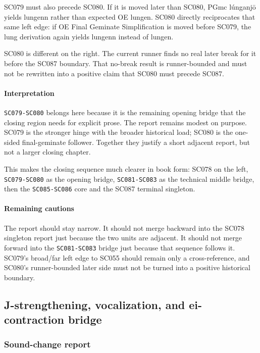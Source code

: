 \documentclass[
  british,
  a4paper,
]{article}
\begin{document}
SC079 must also precede SC080. If it is moved later than SC080, PGmc
lúnganjō yields lungenn rather than expected OE lungen. SC080 directly
reciprocates that same left edge: if OE Final Geminate Simplification is
moved before SC079, the lung derivation again yields lungenn instead of
lungen.

SC080 is different on the right. The current runner finds no real later
break for it before the SC087 boundary. That no-break result is
runner-bounded and must not be rewritten into a positive claim that
SC080 must precede SC087.

\paragraph{Interpretation}\label{interpretation-49}

\texttt{SC079-SC080} belongs here because it is the remaining opening
bridge that the closing region needs for explicit prose. The report
remains modest on purpose. SC079 is the stronger hinge with the broader
historical load; SC080 is the one-sided final-geminate follower.
Together they justify a short adjacent report, but not a larger closing
chapter.

This makes the closing sequence much clearer in book form: SC078 on the
left, \texttt{SC079-SC080} as the opening bridge, \texttt{SC081-SC083}
as the technical middle bridge, then the \texttt{SC085-SC086} core and
the SC087 terminal singleton.

\paragraph{Remaining cautions}\label{remaining-cautions-49}

The report should stay narrow. It should not merge backward into the
SC078 singleton report just because the two units are adjacent. It
should not merge forward into the \texttt{SC081-SC083} bridge just
because that sequence follows it. SC079's broad/far left edge to SC055
should remain only a cross-reference, and SC080's runner-bounded later
side must not be turned into a positive historical boundary.

\subsection{J-strengthening, vocalization, and ei-contraction
bridge}\label{j-strengthening-vocalization-and-ei-contraction-bridge}

\subsubsection{Sound-change report}\label{sound-change-report-50}
\end{document}
